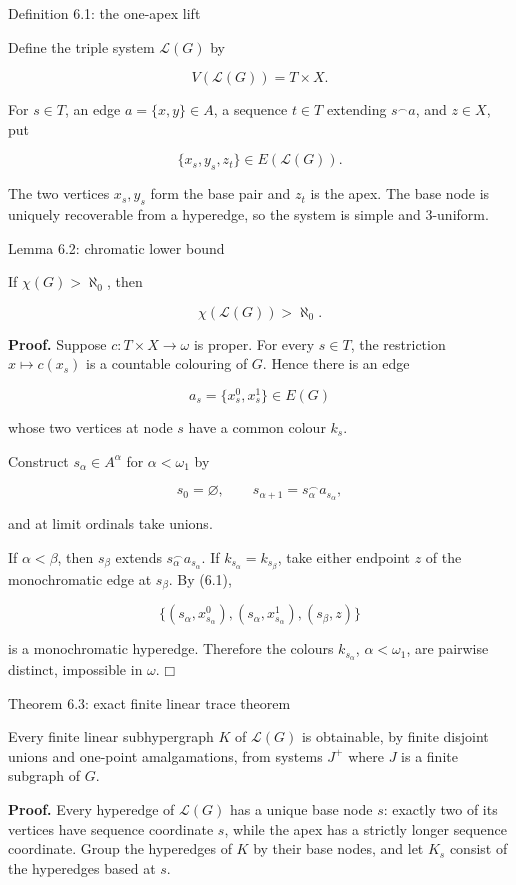 \documentclass[11pt]{article}
\providecommand{\square}{\mdlgwhtsquare}
\begin{document}
\label{definition-6.1-the-one-apex-lift}
\begin{definitionbox}{Definition 6.1: the one-apex lift}

Define the triple system \(\mathcal L(G)\) by

\[
V(\mathcal L(G))=T\times X.
\]

For \(s\in T\), an edge \(a=\{x,y\}\in A\), a sequence \(t\in T\) extending \(s^\frown a\), and \(z\in X\), put

\[
\{x_s,y_s,z_t\}\in E(\mathcal L(G)). \tag{6.1}
\]

The two vertices \(x_s,y_s\) form the base pair and \(z_t\) is the apex. The base node is uniquely recoverable from a hyperedge, so the system is simple and \(3\)-uniform.

\end{definitionbox}
\label{lemma-6.2-chromatic-lower-bound}
\begin{lemmabox}{Lemma 6.2: chromatic lower bound}

If \(\chi(G)>\aleph_0\), then

\[
\chi(\mathcal L(G))>\aleph_0.
\]

\end{lemmabox}
\textbf{Proof.} Suppose \(c:T\times X\to\omega\) is proper. For every \(s\in T\), the restriction \(x\mapsto c(x_s)\) is a countable colouring of \(G\). Hence there is an edge

\[
a_s=\{x_s^0,x_s^1\}\in E(G)
\]

whose two vertices at node \(s\) have a common colour \(k_s\).

Construct \(s_\alpha\in A^\alpha\) for \(\alpha<\omega_1\) by

\[
s_0=\varnothing,
\qquad s_{\alpha+1}=s_\alpha^\frown a_{s_\alpha},
\]

and at limit ordinals take unions.

If \(\alpha<\beta\), then \(s_\beta\) extends \(s_\alpha^\frown a_{s_\alpha}\). If \(k_{s_\alpha}=k_{s_\beta}\), take either endpoint \(z\) of the monochromatic edge at \(s_\beta\). By (6.1),

\[
\{(s_\alpha,x_{s_\alpha}^0),
  (s_\alpha,x_{s_\alpha}^1),
  (s_\beta,z)\}
\]

is a monochromatic hyperedge. Therefore the colours \(k_{s_\alpha}\), \(\alpha<\omega_1\), are pairwise distinct, impossible in \(\omega\). \(\square\)

\label{theorem-6.3-exact-finite-linear-trace-theorem}
\begin{theorembox}{Theorem 6.3: exact finite linear trace theorem}

Every finite linear subhypergraph \(K\) of \(\mathcal L(G)\) is obtainable, by finite disjoint unions and one-point amalgamations, from systems \(J^+\) where \(J\) is a finite subgraph of \(G\).

\end{theorembox}
\textbf{Proof.} Every hyperedge of \(\mathcal L(G)\) has a unique base node \(s\): exactly two of its vertices have sequence coordinate \(s\), while the apex has a strictly longer sequence coordinate. Group the hyperedges of \(K\) by their base nodes, and let \(K_s\) consist of the hyperedges based at \(s\).
\end{document}
